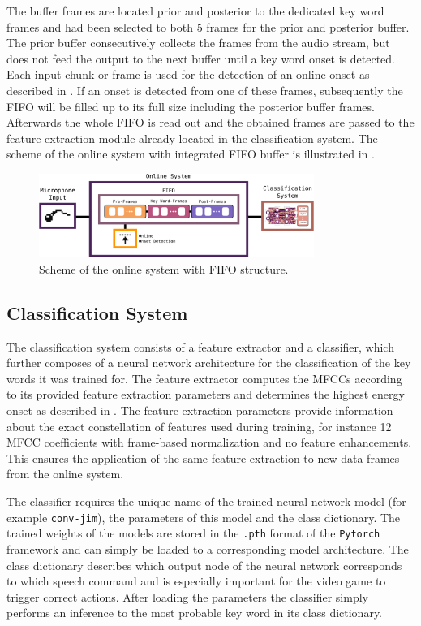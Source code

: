 The buffer frames are located prior and posterior to the dedicated key word frames and had been selected to both 5 frames for the prior and posterior buffer.
The prior buffer consecutively collects the frames from the audio stream, but does not feed the output to the next buffer until a key word onset is detected. 
Each input chunk or frame is used for the detection of an online onset as described in .
If an onset is detected from one of these frames, subsequently the FIFO will be filled up to its full size including the posterior buffer frames.
Afterwards the whole FIFO is read out and the obtained frames are passed to the feature extraction module already located in the classification system.
The scheme of the online system with integrated FIFO buffer is illustrated in .
\begin{figure}[!ht]
  \centering
  \includegraphics[width=0.8\textwidth]{./6_game/figs/game_system_online.pdf}
  \caption{Scheme of the online system with FIFO structure.}
  \label{fig:game_system_online}
\end{figure}
\FloatBarrier
\noindent



\subsection{Classification System}
The classification system consists of a feature extractor and a classifier, which further composes of a neural network architecture for the classification of the key words it was trained for.
The feature extractor computes the MFCCs according to its provided feature extraction parameters and determines the highest energy onset as described in .
The feature extraction parameters provide information about the exact constellation of features used during training, for instance 12 MFCC coefficients with frame-based normalization and no feature enhancements.
This ensures the application of the same feature extraction to new data frames from the online system.

The classifier requires the unique name of the trained neural network model (for example \texttt{conv-jim}), the parameters of this model and the class dictionary.
The trained weights of the  models are stored in the \texttt{.pth} format of the \texttt{Pytorch} framework and can simply be loaded to a corresponding model architecture.
The class dictionary describes which output node of the neural network corresponds to which speech command and is especially important for the video game to trigger correct actions.
After loading the parameters the classifier simply performs an inference to the most probable key word in its class dictionary.

